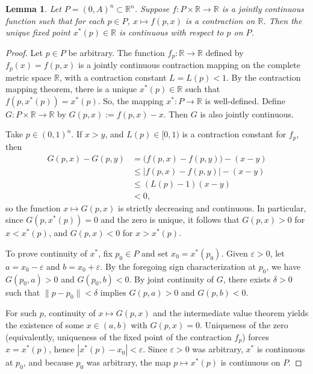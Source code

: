 \documentclass[12pt]{amsart}
\theoremstyle{theorem}
\newtheorem{lemma}{Lemma}
\theoremstyle{remark}
\numberwithin{equation}{section}
\newcommand{\RR}{\mathbb{R}}
\begin{document}
\begin{lemma}\label{lem:contFP}
Let $P = (0,A)^n\subset \RR^n$. Suppose $f:P\times \RR\rightarrow \RR$ is a jointly continuous function such that for each $p \in P$, $x\mapsto f(p, x)$ is a contraction on $\RR$. Then the unique fixed point $x^*(p) \in \RR$ is continuous with respect to $p$ on $P$.
\end{lemma}
\begin{proof}
Let $p \in P$ be arbitrary. The function $f_p: \mathbb{R} \to \mathbb{R}$ defined by $f_p(x) = f(p, x)$ is a jointly continuous contraction mapping on the complete metric space $\mathbb{R}$, with a contraction constant $L=L(p) < 1$. By the contraction mapping theorem, there is a unique $x^*(p) \in \mathbb{R}$ such that $f(p, x^*(p)) = x^*(p)$. So, the mapping $x^*: P \to \mathbb{R}$ is well-defined.
Define $G:P\times\mathbb R\to\mathbb R$ by $G(p,x):=f(p,x)-x$. Then $G$ is also jointly continuous.

Take $p\in(0,1)^n$. If $x>y$, and $L(p)\in[0,1)$ is a contraction constant for $f_p$, then
\begin{align*}
G(p,x)-G(p,y)
&=\bigl(f(p,x)-f(p,y)\bigr)-(x-y)\\
&\le |f(p,x)-f(p,y)|-(x-y)\\
&\le (L(p)-1)(x-y)\\
&<0,
\end{align*}
so the function $x\mapsto G(p,x)$ is strictly decreasing and continuous. In particular, since $G(p,x^*(p))=0$ and the zero is unique, it follows that $G(p,x)>0$ for $x<x^*(p)$, and $G(p,x)<0$ for $x>x^*(p)$.

To prove continuity of $x^*$, fix $p_0\in P$ and set $x_0=x^*(p_0)$. Given $\varepsilon>0$, let $a = x_0-\varepsilon$ and $b=x_0+\varepsilon$. By the foregoing sign characterization at $p_0$, we have $G(p_0,a)>0$ and $G(p_0,b)<0$. By joint continuity of $G$, there exists $\delta>0$ such that $\|p-p_0\|<\delta$ implies $G(p,a)>0$ and $G(p,b)<0$.

For such $p$, continuity of $x\mapsto G(p,x)$ and the intermediate value theorem yields the existence of some $x\in(a,b)$ with $G(p,x)=0$. Uniqueness of the zero (equivalently, uniqueness of the fixed point of the contraction $f_p$) forces $x=x^*(p)$, hence $|x^*(p)-x_0|<\varepsilon$. Since $\varepsilon>0$ was arbitrary, $x^*$ is continuous at $p_0$, and because $p_0$ was arbitrary, the map $p\mapsto x^*(p)$ is continuous on $P$.
\end{proof}
\end{document}
